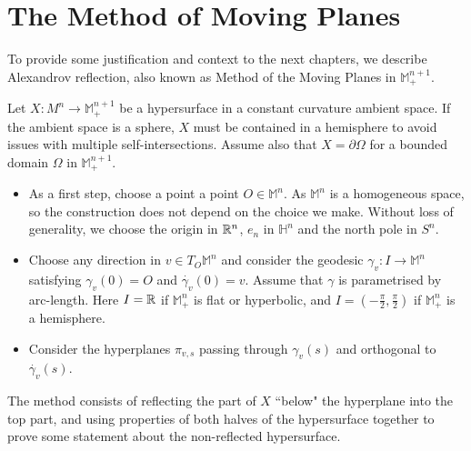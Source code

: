 \section{The Method of Moving Planes}
\label{method moving planes}

To provide some justification and context to the next chapters, we describe Alexandrov reflection, also known as Method of the Moving Planes in $\mathbb{M}^{n+1}_+$.  

Let $X:M^n\rightarrow \mathbb{M}^{n+1}_+$ be a hypersurface in a constant curvature ambient space. If the ambient space is a sphere, $X$ must be contained in a hemisphere to avoid issues with multiple self-intersections. Assume also that $X=\partial\Omega$ for a bounded domain $\Omega$ in $\mathbb{M}^{n+1}_+$. 
\begin{itemize}	
	\item As a first step, choose a point a point $O \in \mathbb{M}^n$. As $\mathbb{M}^n$ is a homogeneous space, so the construction does not depend on the choice we make. Without loss of generality, we choose the origin in $\mathbb{R}^n$, $e_n$ in $\mathbb{H}^n$ and the north pole in $S^n$. 
	\item Choose any direction in $v\in T_O\mathbb{M}^n$ and consider the geodesic $\gamma_v: I \rightarrow \mathbb{M}^n$ satisfying $\gamma_v (0) = O$ and $\dot{\gamma_v} (0) = v$. Assume that $\gamma$ is parametrised by arc-length. Here $I=\mathbb{R}$ if $\mathbb{M}^n_+$ is flat or hyperbolic, and  $I=(-\frac{\pi}{2}, \frac{\pi}{2})$ if $\mathbb{M}^n_+$ is a hemisphere.
	\item Consider the hyperplanes $\pi_{v, s}$ passing through $\gamma_v(s)$ and orthogonal to  $\dot{\gamma_v}(s)$.
\end{itemize}
The method consists of reflecting the part of $X$ ``below" the hyperplane into the top part, and using properties of both halves of the hypersurface together to prove some statement about the non-reflected hypersurface. 

